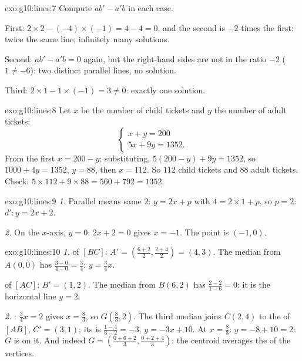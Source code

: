 \begin{solution}{exo:g10:lines:7}
Compute $ab' - a'b$ in each case.

First: $2 \times 2 - (-4) \times (-1) = 4 - 4 = 0$, and the second
 is $-2$ times the first: twice the same line, infinitely many
solutions.

Second: $ab' - a'b = 0$ again, but the right-hand sides are not in the
ratio $-2$ ($1 \neq -6$): two distinct parallel lines, no solution.

Third: $2 \times 1 - 1 \times (-1) = 3 \neq 0$: exactly one solution.
\end{solution}

\begin{solution}{exo:g10:lines:8}
Let $x$ be the number of child tickets and $y$ the number of adult
tickets:
\[
\begin{cases}
x + y = 200 \\
5x + 9y = 1352 .
\end{cases}
\]
From the first  $x = 200 - y$; substituting,
$5(200 - y) + 9y = 1352$, so $1000 + 4y = 1352$, $y = 88$, then
$x = 112$. So $112$ child tickets and $88$ adult tickets. Check:
$5 \times 112 + 9 \times 88 = 560 + 792 = 1352$.
\end{solution}

\begin{solution}{exo:g10:lines:9}
\emph{1.} Parallel means same  $2$: $y = 2x + p$ with
$4 = 2 \times 1 + p$, so $p = 2$: $d'\colon y = 2x + 2$.

\emph{2.} On the $x$-axis, $y = 0$: $2x + 2 = 0$ gives $x = -1$. The
 point is $(-1, 0)$.
\end{solution}

\begin{solution}{exo:g10:lines:10}
\emph{1.}  of $[BC]$: $A' = \left(\frac{6+2}{2},
\frac{2+4}{2}\right) = (4, 3)$. The median from $A(0,0)$ has 
$\frac{3 - 0}{4 - 0} = \frac34$:  $y = \frac34 x$.

 of $[AC]$: $B' = (1, 2)$. The median from $B(6, 2)$ has 
$\frac{2 - 2}{1 - 6} = 0$: it is the horizontal line $y = 2$.

\emph{2.} : $\frac34 x = 2$ gives $x = \frac83$, so
$G\left(\frac83, 2\right)$. The third median joins $C(2,4)$ to the
 of $[AB]$, $C' = (3, 1)$; its  is
$\frac{1 - 4}{3 - 2} = -3$,  $y = -3x + 10$. At $x = \frac83$:
$y = -8 + 10 = 2$: $G$ is on it. And indeed
$G = \left(\frac{0 + 6 + 2}{3}, \frac{0 + 2 + 4}{3}\right)$: the
centroid averages the  of the vertices.
\end{solution}

